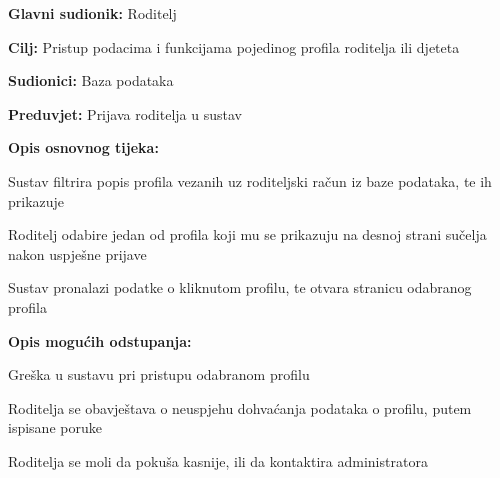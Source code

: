 					\noindent {}
					\begin{packed_item}
						
						\item \textbf{Glavni sudionik: }Roditelj
						\item  \textbf{Cilj:} Pristup podacima i funkcijama pojedinog profila roditelja ili djeteta
						\item  \textbf{Sudionici:} Baza podataka
						\item  \textbf{Preduvjet:} Prijava roditelja u sustav
						\item  \textbf{Opis osnovnog tijeka:}
						
						\item[] \begin{packed_enum}
							
							\item Sustav filtrira popis profila vezanih uz roditeljski račun iz baze podataka, te ih prikazuje
							\item Roditelj odabire jedan od profila koji mu se prikazuju na desnoj strani sučelja nakon uspješne prijave
							\item Sustav pronalazi podatke o kliknutom profilu, te otvara stranicu odabranog profila
							
						\end{packed_enum}
						\item  \textbf{Opis mogućih odstupanja:}
						\item[] \begin{packed_item}
							
							\item[1.a] Greška u sustavu pri pristupu odabranom profilu
							\item[] \begin{packed_enum}
								
								\item Roditelja se obavještava o neuspjehu dohvaćanja podataka o profilu, putem ispisane poruke
								\item Roditelja se moli da pokuša kasnije, ili da kontaktira administratora
								
							\end{packed_enum}
						\end{packed_item}
						
					\end{packed_item}
					
